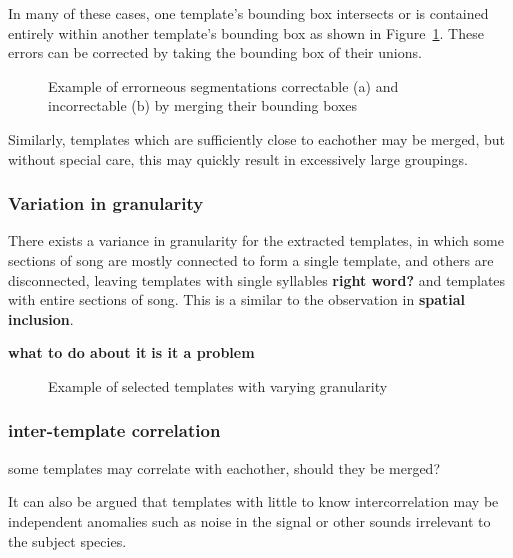 In many of these cases, one template's bounding box intersects or is contained
entirely within another template's bounding box as shown in
Figure~\ref{fig:segment_intersect_a}.
These errors can be corrected by taking the bounding box of their unions.

\begin{figure}[h]
  \centering
  \begin{subfigure}[h]{0.5\textwidth}
    \centering
    \caption{}\label{fig:segment_intersect_a}
  \end{subfigure}
  \begin{subfigure}[h]{0.5\textwidth}
    \centering
    \caption{}
  \end{subfigure}
  \caption{Example of errorneous segmentations correctable (a) and incorrectable (b)
  by merging their bounding boxes}
  \label{fig:segment_intersect}
\end{figure}

Similarly, templates which are sufficiently close to eachother may be merged,
but without special care, this may quickly result in excessively large groupings.

\subsubsection{Variation in granularity}
There exists a variance in granularity for the extracted templates, in which
some sections of song are mostly connected to form a single template, and others
are disconnected, leaving templates with single syllables \textbf{right word?}
and templates with entire sections of song.
This is a similar to the observation in \textbf{spatial inclusion}.

\textbf{what to do about it}
\textbf{is it a problem}

\begin{figure}[!htb]
  \centering
  \caption{Example of selected templates with varying granularity}
\end{figure}


\subsubsection{inter-template correlation}
some templates may correlate with eachother, should they be merged?

It can also be argued that templates with little to know intercorrelation may be
independent anomalies such as noise in the signal or other sounds irrelevant to
the subject species.

